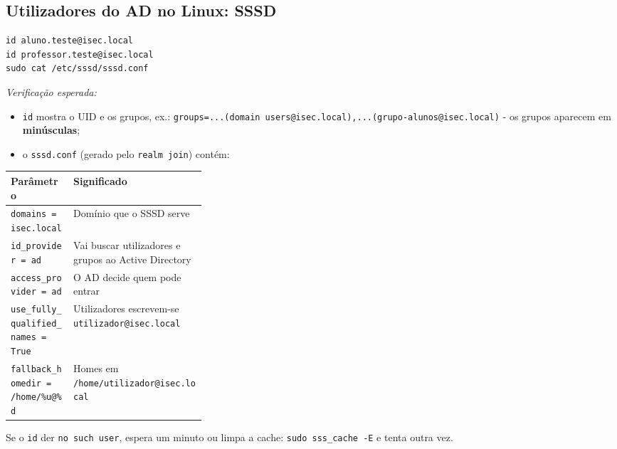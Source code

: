 
\subsection[Utilizadores do AD no Linux: SSSD]{Utilizadores do AD no Linux: SSSD}



\begin{lstlisting}[style=bashstyle]
id aluno.teste@isec.local
id professor.teste@isec.local
sudo cat /etc/sssd/sssd.conf
\end{lstlisting}

\emph{Verificação esperada:}

\begin{itemize}
\item \texttt{id} mostra o UID e os grupos, ex.: \texttt{groups=...(domain users@isec.local),\allowbreak{}...(grupo-alunos@isec.local)} - os grupos aparecem em \textbf{minúsculas};
\item o \texttt{sssd.conf} (gerado pelo \texttt{realm join}) contém:
\end{itemize}

\begin{center}\small
\begin{tabularx}{\linewidth}{|>{\raggedright\arraybackslash}p{0.32\linewidth}|>{\raggedright\arraybackslash}X|}
\hline
\rowcolor{azul!10}\textbf{Parâmetro} & \textbf{Significado} \\
\hline
\texttt{domains = isec.local} & Domínio que o SSSD serve \\
\hline
\texttt{id\_provider = ad} & Vai buscar utilizadores e grupos ao Active Directory \\
\hline
\texttt{access\_provider = ad} & O AD decide quem pode entrar \\
\hline
\texttt{use\_fully\_qualified\_names = True} & Utilizadores escrevem-se \texttt{utilizador@isec.local} \\
\hline
\texttt{fallback\_homedir = /\allowbreak{}home/\allowbreak{}\%u@\%d} & Homes em \texttt{/\allowbreak{}home/\allowbreak{}utilizador@isec.local} \\
\hline
\end{tabularx}
\end{center}

Se o \texttt{id} der \texttt{no such user}, espera um minuto ou limpa a cache: \texttt{sudo sss\_cache -E} e tenta outra vez.

